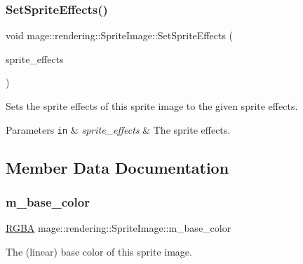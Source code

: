 \subsubsection{\texorpdfstring{Set\+Sprite\+Effects()}{SetSpriteEffects()}}
{\footnotesize\ttfamily void mage\+::rendering\+::\+Sprite\+Image\+::\+Set\+Sprite\+Effects (\begin{DoxyParamCaption}\item[{\mbox{\hyperlink{namespacemage_1_1rendering_a4dbc3536c87b906f1d41d863ec458e78}{Sprite\+Effect}}}]{sprite\+\_\+effects }\end{DoxyParamCaption})\hspace{0.3cm}{\ttfamily [noexcept]}}

Sets the sprite effects of this sprite image to the given sprite effects.


\begin{DoxyParams}[1]{Parameters}
\mbox{\tt in}  & {\em sprite\+\_\+effects} & The sprite effects. \\
\hline
\end{DoxyParams}


\subsection{Member Data Documentation}
\mbox{\label{classmage_1_1rendering_1_1_sprite_image_a9f17f78cd6731bc604daa2b4f2593435}} 
\subsubsection{\texorpdfstring{m\+\_\+base\+\_\+color}{m\_base\_color}}
{\footnotesize\ttfamily \mbox{\hyperlink{structmage_1_1_r_g_b_a}{R\+G\+BA}} mage\+::rendering\+::\+Sprite\+Image\+::m\+\_\+base\+\_\+color\hspace{0.3cm}{\ttfamily [private]}}

The (linear) base color of this sprite image. \mbox{\label{classmage_1_1rendering_1_1_sprite_image_a1b68c232550bfc55aa794fcffbeab489}} 
